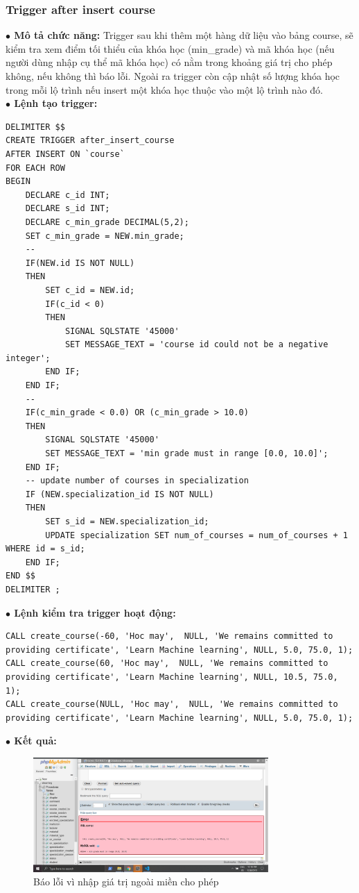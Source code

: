 \documentclass[12pt,a4paper,titlepage]{article}
\begin{document}
\subsubsection{Trigger after insert course}
\textbf{$\bullet$ Mô tả chức năng:} Trigger sau khi thêm một hàng dữ liệu vào bảng course, sẽ kiểm tra xem điểm tối thiểu của khóa học (min_grade) và mã khóa học (nếu người dùng nhập cụ thể mã khóa học) có nằm trong khoảng giá trị cho phép không, nếu không thì báo lỗi. Ngoài ra trigger còn cập nhật số lượng khóa học trong mỗi lộ trình nếu insert một khóa học thuộc vào một lộ trình nào đó.\\
\textbf{$\bullet$ Lệnh tạo trigger:}
\begin{lstlisting}
DELIMITER $$
CREATE TRIGGER after_insert_course
AFTER INSERT ON `course`
FOR EACH ROW
BEGIN
	DECLARE c_id INT;
	DECLARE s_id INT;
	DECLARE c_min_grade DECIMAL(5,2);
	SET c_min_grade = NEW.min_grade;
	--
	IF(NEW.id IS NOT NULL)
	THEN
		SET c_id = NEW.id;
		IF(c_id < 0)
		THEN
			SIGNAL SQLSTATE '45000'
			SET MESSAGE_TEXT = 'course id could not be a negative integer';
		END IF;
	END IF;
	--
	IF(c_min_grade < 0.0) OR (c_min_grade > 10.0)
	THEN
		SIGNAL SQLSTATE '45000'
		SET MESSAGE_TEXT = 'min grade must in range [0.0, 10.0]';
	END IF;
	-- update number of courses in specialization
	IF (NEW.specialization_id IS NOT NULL)
	THEN
        SET s_id = NEW.specialization_id;
		UPDATE specialization SET num_of_courses = num_of_courses + 1 WHERE id = s_id;
	END IF;
END $$ 
DELIMITER ;
\end{lstlisting}
\textbf{$\bullet$ Lệnh kiểm tra trigger hoạt động:}
\begin{lstlisting}
CALL create_course(-60, 'Hoc may',  NULL, 'We remains committed to providing certificate', 'Learn Machine learning', NULL, 5.0, 75.0, 1);
CALL create_course(60, 'Hoc may',  NULL, 'We remains committed to providing certificate', 'Learn Machine learning', NULL, 10.5, 75.0, 1);
CALL create_course(NULL, 'Hoc may',  NULL, 'We remains committed to providing certificate', 'Learn Machine learning', NULL, 5.0, 75.0, 1);
\end{lstlisting}
\textbf{$\bullet$ Kết quả:}
\newpage
\begin{figure}[h!]
	\centering
	\caption{Báo lỗi vì nhập giá trị ngoài miền cho phép}
	\includegraphics[width=0.8\textwidth]{images/triggerc1.png}
\end{figure}
\end{document}
